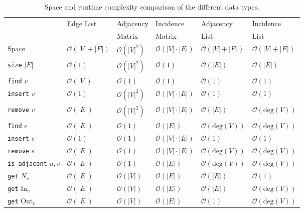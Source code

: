             \begin{table}
            \begin{center}
                \begin{tabular}[c]{l l l l l l} \toprule
                \multirow{2}{*}{} & Edge List & Adjacency & Incidence & Adjacency  & Incidence \\ 
                & &  Matrix & Matrix & List & List \\ \midrule
                Space & $\mathcal{O}(|V| + |E|)$ & $\mathcal{O}(|V|^2)$ & $\mathcal{O}(|V| \cdot |E|)$ & $\mathcal{O}(|V| + |E|)$ & $\mathcal{O}(|V| + |E|)$ \\
                \texttt{size} $|E|$ & $\mathcal{O}(1)$ & $\mathcal{O}(|V|^2)$ & $\mathcal{O}(1)$ & $\mathcal{O}(|E|)$ & $\mathcal{O}(|E|)$ \\
                \texttt{find} $v$ & $\mathcal{O}(|V|)$ & $\mathcal{O}(1)$ & $\mathcal{O}(1)$ & $\mathcal{O}(1)$ & $\mathcal{O}(1)$ \\
                \texttt{insert} $v$ & $\mathcal{O}(1)$ & $\mathcal{O}(|V|^2)$ & $\mathcal{O}(|V| \cdot |E|)$ & $\mathcal{O}(1)$ & $\mathcal{O}(1)$ \\
                \texttt{remove} $v$ & $\mathcal{O}(|E|)$ & $\mathcal{O}(|V|^2)$ & $\mathcal{O}(|V| \cdot |E|)$ & $\mathcal{O}(|E|)$ & $\mathcal{O}(\text{deg}(V))$ \\
                \texttt{find} $e$ & $\mathcal{O}(|E|)$ & $\mathcal{O}(1)$ & $\mathcal{O}(|E|)$ & $\mathcal{O}(\text{deg}(V))$ & $\mathcal{O}(\text{deg}(V))$ \\
                \texttt{insert} $e$ & $\mathcal{O}(1)$ & $\mathcal{O}(1)$ & $\mathcal{O}(|V| \cdot |E|)$ & $\mathcal{O}(1)$ & $\mathcal{O}(1)$ \\
                \texttt{remove} $e$ & $\mathcal{O}(|E|)$ & $\mathcal{O}(1)$ & $\mathcal{O}(|V| \cdot |E|)$ & $\mathcal{O}(\text{deg}(V))$ & $\mathcal{O}(\text{deg}(V))$ \\
                \texttt{is_adjacent} $u, v$ & $\mathcal{O}(|E|)$ & $\mathcal{O}(1)$ & $\mathcal{O}(|E|)$ & $\mathcal{O}(\text{deg}(V))$ & $\mathcal{O}(\text{deg}(V))$ \\
                \texttt{get} $N_v$ & $\mathcal{O}(|E|)$ & $\mathcal{O}(|V|)$ & $\mathcal{O}(|E|)$ & $\mathcal{O}(|E|)$ & $\mathcal{O}(1)$ \\
                \texttt{get} $\text{In}_v$ & $\mathcal{O}(|E|)$ & $\mathcal{O}(|V|)$ & $\mathcal{O}(|E|)$ & $\mathcal{O}(|E|)$ & $\mathcal{O}(\text{deg}(V))$ \\
                \texttt{get} $\text{Out}_v$ & $\mathcal{O}(|E|)$ & $\mathcal{O}(|V|)$ & $\mathcal{O}(|E|)$ & $\mathcal{O}(1)$ & $\mathcal{O}(\text{deg}(V))$ \\ \bottomrule
            \end{tabular}
            \end{center}
            \caption{Space and runtime complexity comparison of the different data types.}
            \label{sumtabds}
            \end{table}

